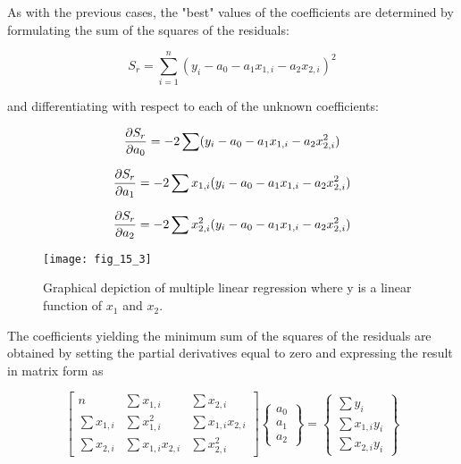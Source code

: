 \documentclass[../main.tex]{subfiles}
\begin{document}
As with the previous cases, the "best" values of the coefficients are determined by formulating the sum of the squares of the residuals:

\begin{equation}
	\tag{15.4}
	S_r = \sum_{i=1}^n (y_i - a_0 - a_1x_{1,i} - a_2x_{2,i})^2
\end{equation}

\noindent and differentiating with respect to each of the unknown coefficients:

\begin{equation}
	\notag
	\frac{\partial S_r}{\partial a_0} = -2 \sum (y_i -a_0 -a_1x_{1,i} - a_2x_{2,i}^2)
\end{equation}

\begin{equation}
	\notag
	\frac{\partial S_r}{\partial a_1} = -2 \sum x_{1,i} (y_i -a_0 -a_1x_{1,i} - a_2x_{2,i}^2)
\end{equation}

\begin{equation}
	\notag
	\frac{\partial S_r}{\partial a_2} = -2 \sum x_{2,i}^2 (y_i -a_0 -a_1x_{1,i} - a_2x_{2,i}^2)
\end{equation}

\begin{figure}[H]
    \centering
    \texttt{[image: fig\_15\_3]}
   \caption{\textsf{Graphical depiction of multiple linear regression where y is a linear function of $x_1$ and $x_2$.}}
   \label{fig:fig_15_3}
\end{figure}

\noindent The coefficients yielding the minimum sum of the squares of the residuals are obtained by setting the partial derivatives equal to zero and expressing the result in matrix form as 

\begin{equation} %
	\tag{15.5}
	\begin{bmatrix}
		n & \sum x_{1,i} & \sum x_{2,i} \\
		\sum x_{1,i} & \sum x_{1,i}^2 & \sum x_{1,i} x_{2,i} \\
		\sum x_{2,i} & \sum x_{1,i} x_{2,i} & \sum x_{2,i}^2
	\end{bmatrix}
	\begin{Bmatrix}
		a_0 \\ a_1 \\ a_2
	\end{Bmatrix} =
	\begin{Bmatrix}
		\sum y_i \\ \sum x_{1,i} y_i \\ \sum x_{2,i} y_i
	\end{Bmatrix}
\end{equation}
\end{document}
